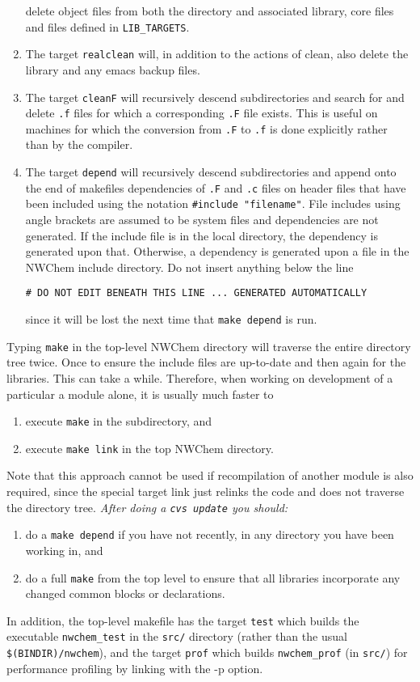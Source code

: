 \begin{enumerate}
  delete object files from both the directory and associated library, 
  core files and files defined in {\tt LIB\_TARGETS}.
\item The target {\tt realclean} will, in addition to the actions of
  clean, also delete the library and any emacs backup files.
\item The target {\tt cleanF} will recursively descend subdirectories
  and search for and delete \verb+.f+ files for which a corresponding
  \verb+.F+ file exists.  This is useful on machines for which the
  conversion from \verb+.F+ to \verb+.f+ is done explicitly rather
  than by the compiler.
\item The target {\tt depend} will recursively descend subdirectories
  and append onto the end of makefiles dependencies of \verb+.F+ and
  \verb+.c+ files on header files that have been included using the
  notation \verb+#include "filename"+.  File includes using angle
  brackets are assumed to be system files and dependencies are not
  generated.  If the include file is in the local directory, the
  dependency is generated upon that.  Otherwise, a dependency is
  generated upon a file in the NWChem include directory.
  Do not insert anything below the line
\begin{verbatim}
# DO NOT EDIT BENEATH THIS LINE ... GENERATED AUTOMATICALLY
\end{verbatim}
  since it will be lost the next time that \verb+make depend+
  is run.
\end{enumerate}

Typing {\tt make} in the top-level NWChem directory will traverse the
entire directory tree twice.  Once to ensure the include files are
up-to-date and then again for the libraries.  This can take a while.
Therefore, 
when working on development of a particular a module alone,
it is usually much faster to 
\begin{enumerate}
\item execute {\tt make} in the subdirectory, and
\item execute {\tt make link} in the top NWChem directory.
\end{enumerate}

Note that this approach cannot be used if recompilation of another
module is also required, since the
special target link just relinks the code and does not traverse
the directory tree.  {\em After doing a \verb+cvs update+ you should:}
\begin{enumerate}
\item do a {\tt make depend}
 if you have not recently, in any directory you
  have been working in, and
\item do a full {\tt make} from the top level to ensure that all libraries
  incorporate any changed common blocks or declarations.
\end{enumerate}

In addition, the top-level makefile has the target {\tt test} which
builds the executable \verb+nwchem_test+ in the \verb+src/+ directory
(rather than the usual \verb+$(BINDIR)/nwchem+), %
and the target {\tt prof} 
which builds \verb+nwchem_prof+ (in \verb+src/+)
for performance profiling by linking with the -p option.

